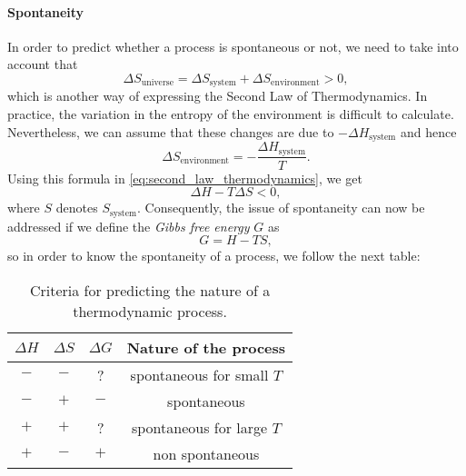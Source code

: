 \documentclass[a4paper,10pt]{article}
\theoremstyle{plain}
\theoremstyle{definition}
\theoremstyle{remark}
\begin{document}
\paragraph{Spontaneity}In order to predict whether a process is spontaneous or not, we need to take into account that
\begin{equation}\label{eq:second_law_thermodynamics}
\Delta S_{\text{universe}} = \Delta S_{\text{system}} + \Delta S_{\text{environment}}>0,
\end{equation}
which is another way of expressing the Second Law of Thermodynamics. In practice, the variation in the entropy of the environment is difficult to calculate. Nevertheless, we can assume that these changes are due to $-\Delta H_{\text{system}}$ and hence
\begin{equation}
\Delta S_{\text{environment}} = -\frac{\Delta H_{\text{system}}}{T}.
\end{equation}
Using this formula in \eqref{eq:second_law_thermodynamics}, we get
\begin{equation}
\Delta H - T\Delta S < 0,
\end{equation}
where $S$ denotes $S_{\text{system}}$. Consequently, the issue of spontaneity can now be addressed if we define the \textit{Gibbs free energy} $G$ as
\begin{equation}
G = H - TS,
\end{equation}
so in order to know the spontaneity of a process, we follow the next table:
\begin{table}[h]
\begin{center}
\begin{tabular}{cccc}
   $\Delta H$ & $\Delta S$ & $\Delta G$ & Nature of the process  \\ \hline
   $-$ & $-$ & ? & spontaneous for small $T$\\
   $-$ & $+$ & $-$ & spontaneous\\
   $+$ & $+$ & ? & spontaneous for large $T$\\
   $+$ & $-$ & $+$ & non spontaneous\\
\end{tabular}
\caption{Criteria for predicting the nature of a thermodynamic process.}
\end{center}
\end{table}
\end{document}

